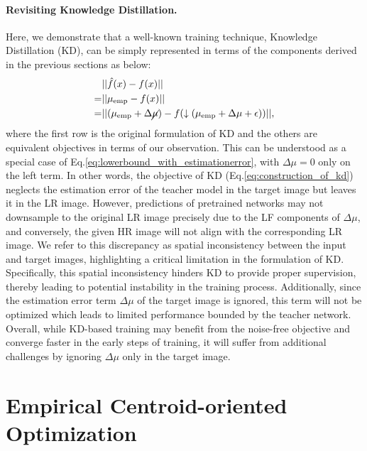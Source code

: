 \documentclass[letterpaper]{article} %
\begin{document}
\paragraph{Revisiting Knowledge Distillation.}
Here, we demonstrate that a well-known training technique, Knowledge Distillation (KD), can be simply represented in terms of the components derived in the previous sections as below:
\begin{equation}
        \label{eq:construction_of_kd}
        \begin{aligned}
        &||\hat{f}(x) - f(x)|| \\
        =&||\mu_{\text{emp}} - f(x)|| \\
        =&||(\mu_{\text{emp}} + \Delta\cancel{\mu}) - f(\downarrow(\mu_{\text{emp}} + \Delta\mu + \epsilon))||
        ,
        \end{aligned}
\end{equation}
where the first row is the original formulation of KD and the others are equivalent objectives in terms of our observation. 
%
This can be understood as a special case of Eq.\eqref{eq:lowerbound_with_estimationerror}, with $\Delta \mu = 0$ only on the left term. In other words, the objective of KD (Eq.\eqref{eq:construction_of_kd}) neglects the estimation error of the teacher model in the target image but leaves it in the LR image. 
%
However, predictions of pretrained networks may not downsample to the original LR image precisely due to the LF components of 
$\Delta \mu$, and conversely, the given HR image will not align with the corresponding LR image.
%
We refer to this discrepancy as spatial inconsistency between the input and target images, highlighting a critical limitation in the formulation of KD.
Specifically, this spatial inconsistency hinders KD to provide proper supervision, thereby leading to potential instability in the training process.
%
Additionally, since the estimation error term $\Delta \mu$ of the target image is ignored, this term will not be optimized which leads to limited performance bounded by the teacher network.
%
Overall, while KD-based training may benefit from the noise-free objective and converge faster in the early steps of training, it will suffer from additional challenges by ignoring $\Delta \mu$ only in the target image.





\section{Empirical Centroid-oriented Optimization} \label{sec:ecoo_method}
\end{document}
